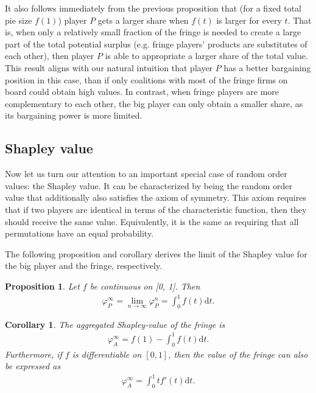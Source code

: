 \documentclass[a4paper]{article}
\newtheorem{proposition}{Proposition}
\newtheorem{corollary}{Corollary}
\newcommand{\dt}{\mathrm{d}t}
\begin{document}
It also follows immediately from the previous proposition that (for a fixed total pie size $f(1)$) player $P$ gets a larger share when $f(t)$ is larger for every $t$.
That is, when only a relatively small fraction of the fringe is needed to create a large part of the total potential surplus (e.g. fringe players' products are substitutes of each other), then player $P$ is able to appropriate a larger share of the total value.
This result aligns with our natural intuition that player $P$ has a better bargaining position in this case, than if only coalitions with most of the fringe firms on board could obtain high values.
In contrast, when fringe players are more complementary to each other, the big player can only obtain a smaller share, as its bargaining power is more limited.


\subsection{Shapley value}

Now let us turn our attention to an important special case of random order values: the Shapley value.
It can be characterized by being the random order value that additionally also satisfies the axiom of symmetry.
This axiom requires that if two players are identical in terms of the characteristic function, then they should receive the same value.
Equivalently, it is the same as requiring that all permutations have an equal probability.

The following proposition and corollary derives the limit of the Shapley value for the big player and the fringe, respectively.

\begin{proposition}
    \label{prop:one_sided}
    Let $f$ be continuous on [0, 1]. Then
    \begin{align*}
        \varphi_P^\infty = \lim_{n \to \infty} \varphi_P^n = \int_0^1 f(t) \dt .
    \end{align*}
\end{proposition}

\begin{corollary}
    \label{cor:fringe_value}
    The aggregated Shapley-value of the fringe is
    \begin{align*}
        \varphi_A^\infty = f(1) - \int_0^1 f(t) \dt.
    \end{align*}
    Furthermore, if $f$ is differentiable on $[0, 1]$, then the value of the fringe can also be expressed as
    \begin{align*}
        \varphi_A^\infty = \int_0^1 t f'(t) \dt.
    \end{align*}
\end{corollary}
\end{document}
